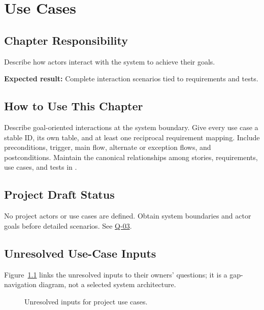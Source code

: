 \chapter{Use Cases}
\section{Chapter Responsibility}
\label{Section:UseCasesResponsibility}
Describe how actors interact with the system to achieve their goals.

\noindent\textbf{Expected result:} Complete interaction scenarios tied to requirements and tests.

\section{How to Use This Chapter}
Describe goal-oriented interactions at the system boundary. Give every use case
a stable ID, its own table, and at least one reciprocal requirement mapping.
Include preconditions, trigger, main flow, alternate or exception flows, and
postconditions. Maintain the canonical relationships among stories,
requirements, use cases, and tests in .

\section{Project Draft Status}
No project actors or use cases are defined. Obtain system boundaries and actor goals before detailed scenarios. See \hyperref[Question:Q-03]{Q-03}.

\section{Unresolved Use-Case Inputs}
Figure~\ref{Figure:UseCaseDiagram} links the unresolved inputs to their owners'
questions; it is a gap-navigation diagram, not a selected system architecture.
\begin{figure}[!htbp]\centering

\caption{Unresolved inputs for project use cases.}\label{Figure:UseCaseDiagram}
\end{figure}
